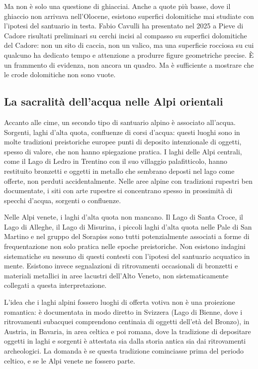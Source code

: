 Ma non è solo una questione di ghiacciai. Anche a quote più basse, dove il ghiaccio non arrivava nell'Olocene, esistono superfici dolomitiche mai studiate con l'ipotesi del santuario in testa. Fabio Cavulli ha presentato nel 2025 a Pieve di Cadore risultati preliminari su cerchi incisi al compasso su superfici dolomitiche del Cadore: non un sito di caccia, non un valico, ma una superficie rocciosa su cui qualcuno ha dedicato tempo e attenzione a produrre figure geometriche precise. È un frammento di evidenza, non ancora un quadro. Ma è sufficiente a mostrare che le crode dolomitiche non sono vuote.

\subsection*{La sacralità dell'acqua nelle Alpi orientali}

Accanto alle cime, un secondo tipo di santuario alpino è associato all'acqua. Sorgenti, laghi d'alta quota, confluenze di corsi d'acqua: questi luoghi sono in molte tradizioni preistoriche europee punti di deposito intenzionale di oggetti, spesso di valore, che non hanno spiegazione pratica. I laghi delle Alpi centrali, come il Lago di Ledro in Trentino con il suo villaggio palafitticolo, hanno restituito bronzetti e oggetti in metallo che sembrano deposti nel lago come offerte, non perduti accidentalmente. Nelle aree alpine con tradizioni rupestri ben documentate, i siti con arte rupestre si concentrano spesso in prossimità di specchi d'acqua, sorgenti o confluenze.

Nelle Alpi venete, i laghi d'alta quota non mancano. Il Lago di Santa Croce, il Lago di Alleghe, il Lago di Misurina, i piccoli laghi d'alta quota nelle Pale di San Martino e nel gruppo del Sorapiss sono tutti potenzialmente associati a forme di frequentazione non solo pratica nelle epoche preistoriche. Non esistono indagini sistematiche su nessuno di questi contesti con l'ipotesi del santuario acquatico in mente. Esistono invece segnalazioni di ritrovamenti occasionali di bronzetti e materiali metallici in aree lacustri dell'Alto Veneto, non sistematicamente collegati a questa interpretazione.

L'idea che i laghi alpini fossero luoghi di offerta votiva non è una proiezione romantica: è documentata in modo diretto in Svizzera (Lago di Bienne, dove i ritrovamenti subacquei comprendono centinaia di oggetti dell'età del Bronzo), in Austria, in Bavaria, in area celtica e poi romana, dove la tradizione di depositare oggetti in laghi e sorgenti è attestata sia dalla storia antica sia dai ritrovamenti archeologici. La domanda è se questa tradizione cominciasse prima del periodo celtico, e se le Alpi venete ne fossero parte.


